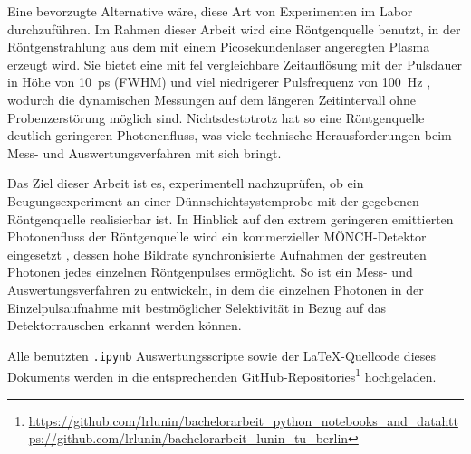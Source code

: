 \noindent
Eine bevorzugte Alternative wäre, diese Art von Experimenten im Labor durchzuführen. Im Rahmen dieser Arbeit wird eine Röntgenquelle benutzt, in der Röntgenstrahlung aus dem mit einem Picosekundenlaser angeregten Plasma erzeugt wird. Sie bietet eine mit \gls{fel} vergleichbare Zeitauflösung mit der Pulsdauer in Höhe von \SI{10}{\pico\second} (FWHM) und viel niedrigerer Pulsfrequenz von \SI{100}{\hertz} \cite{schick_laser-driven_2021}, wodurch die dynamischen Messungen auf dem längeren Zeitintervall ohne Probenzerstörung möglich sind. Nichtsdestotrotz hat so eine Röntgenquelle deutlich geringeren Photonenfluss, was viele technische Herausforderungen beim Mess- und Auswertungsverfahren mit sich bringt.

\noindent
Das Ziel dieser Arbeit ist es, experimentell nachzuprüfen, ob ein Beugungsexperiment an einer Dünnschichtsystemprobe mit der gegebenen Röntgenquelle realisierbar ist. In Hinblick auf den extrem geringeren emittierten Photonenfluss der Röntgenquelle wird ein kommerzieller MÖNCH-Detektor eingesetzt \cite{ramilli-measurements-2017}, dessen hohe Bildrate synchronisierte Aufnahmen der gestreuten Photonen jedes einzelnen Röntgenpulses ermöglicht. So ist ein Mess- und Auswertungsverfahren zu entwickeln, in dem die einzelnen Photonen in der Einzelpulsaufnahme mit bestmöglicher Selektivität in Bezug auf das Detektorrauschen erkannt werden können.

\noindent
Alle benutzten \texttt{.ipynb} Auswertungsscripte sowie der \LaTeX-Quellcode dieses Dokuments werden in die entsprechenden GitHub-Repositories\footnote{\url{https://github.com/lrlunin/bachelorarbeit_python_notebooks_and_data}\newline\url{https://github.com/lrlunin/bachelorarbeit_lunin_tu_berlin}} hochgeladen.   
